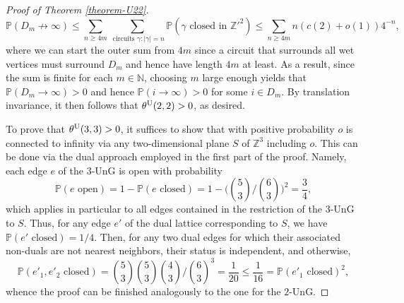 \documentclass[a4paper, oneside, 11pt]{amsart}
\newcommand{\N}{\mathbb{N}}
\theoremstyle{definition}
\renewcommand{\P}{\mathbb{P}}
\newcommand{\1}{\mathbbm{1}}
\newcommand{\0}{\mathbf{o}}
\newcommand{\Z}{\mathbb{Z}}
\newcommand*{\be}{\begin{equation}}
\newcommand*{\ee}{\end{equation}}
\numberwithin{equation}{section}
\begin{document}
\begin{proof}[Proof of Theorem \ref{theorem-U22}]
    \be 
    \P(D_m \not\to \infty )\leq \sum_{n\ge4m} \sum_{\text{ circuits }\gamma\colon |\gamma|=n}\P(\gamma\text{ closed in }\Z'^2)\leq \sum_{n\ge4m} n(c(2)+o(1))4^{-n},
    \ee 
    where we can start the outer sum from $4m$ since a circuit that surrounds all wet vertices must surround $D_m$ and hence have length $4m$ at least. 
    As a result, since the sum is finite for each $m\in\N$, choosing $m$ large enough yields that $\P(D_m\to \infty)>0$ and hence $\P(i\to \infty)>0$ for some $i\in D_m$. By translation invariance, it then follows that $\theta^{\rm U}(2,2)>0$, as desired.

    To prove that $\theta^{\rm U}(3,3)>0$, it suffices to show that with positive probability $o$ is connected to infinity via any two-dimensional plane $S$ of $\Z^3$ including $o$. This can be done via the dual approach employed in the first part of the proof. %
    Namely, each edge $e$ of the $3$-UnG is open with probability
    \be 
    \P(e \text{ open})=1-\P(e\text{ closed})=1-\bigg(\binom{5}{3}\Big/ \binom{6}{3}\bigg)^2=\frac34,
    \ee
    which applies in particular to all edges contained in the restriction of the $3$-UnG to $S$. Thus, for any edge $e'$ of the dual lattice corresponding to $S$, we have $\P(e'\text{ closed})=1/4$. Then, for any two dual edges for which their associated non-duals are not nearest neighbors, their status is independent, and otherwise,
    \[ 
        \P(e'_1,e'_2\text{ closed}) = \binom{5}{3}\binom{5}{3}\binom{4}{3}\Big/\binom{6}{3}^3 = \frac{1}{20}\leq \frac{1}{16} = \P(e'_1\text{ closed})^2,
    \]
whence the proof can be finished analogously to the one for the $2$-UnG. 
\end{proof}
\end{document}
